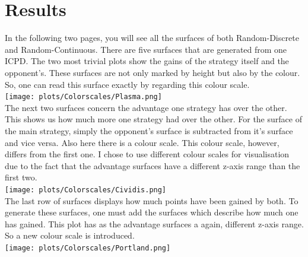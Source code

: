 \documentclass{article}
\begin{document}
\section{Results}

In the following two pages, you will see all the surfaces of both Random-Discrete and Random-Continuous.
There are five surfaces that are generated from one ICPD.
The two most trivial plots show the gains of the strategy itself and the opponent's.
These surfaces are not only marked by height but also by the colour.
So, one can read this surface exactly by regarding this colour scale.\\
\texttt{[image: plots/Colorscales/Plasma.png]}\\
The next two surfaces concern the advantage one strategy has over the other.
This shows us how much more one strategy had over the other.
For the surface of the main strategy, simply the opponent's surface is subtracted from it's surface and vice versa.
Also here there is a colour scale.
This colour scale, however, differs from the first one.
I chose to use different colour scales for visualisation due to the fact that the advantage surfaces have a different z-axis range than the first two.\\
\texttt{[image: plots/Colorscales/Cividis.png]}\\
The last row of surfaces displays how much points have been gained by both.
To generate these surfaces, one must add the surfaces which describe how much one has gained.
This plot has as the advantage surfaces a again, different z-axis range.
So a new colour scale is introduced.\\
\texttt{[image: plots/Colorscales/Portland.png]}\\


\newpage

\def \w {0.20}
\def \a {45}
\end{document}
